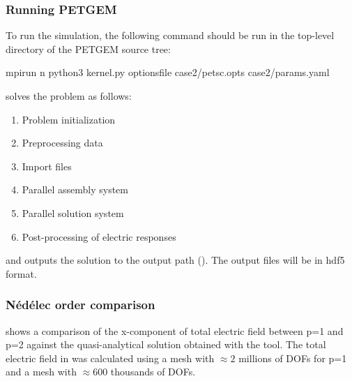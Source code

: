 \documentclass[letterpaper,10pt,english]{sphinxmanual}
\begin{document}
\subsubsection{Running PETGEM}
\label{\detokenize{Manual:id10}}
To run the simulation, the following command should be run in the top-level
directory of the PETGEM source tree:

\begin{sphinxVerbatim}[commandchars=\\\{\}]
\PYGZdl{} mpirun \PYGZhy{}n  python3 kernel.py \PYGZhy{}options\PYGZus{}file case2/petsc.opts case2/params.yaml
\end{sphinxVerbatim}

 solves the problem as follows:
\begin{enumerate}
%
\item {} 
Problem initialization

\item {} 
Preprocessing data

\item {} 
Import files

\item {} 
Parallel assembly system

\item {} 
Parallel solution system

\item {} 
Post-processing of electric responses

\end{enumerate}

and outputs the solution to the output path
(). The output files will be in hdf5 format.


\subsubsection{Nédélec order comparison}
\label{\detokenize{Manual:nedelec-order-comparison}}
{\hyperref[\detokenize{Manual:figure-7-10}]{}} shows a comparison of the x-component of total electric field between p=1
and p=2 against the quasi-analytical solution obtained with the
 tool. The total
electric field in {\hyperref[\detokenize{Manual:figure-7-10}]{}} was calculated using a
mesh with \(\approx2\) millions of DOFs for p=1 and a mesh with
\(\approx600\) thousands of DOFs.
\end{document}
